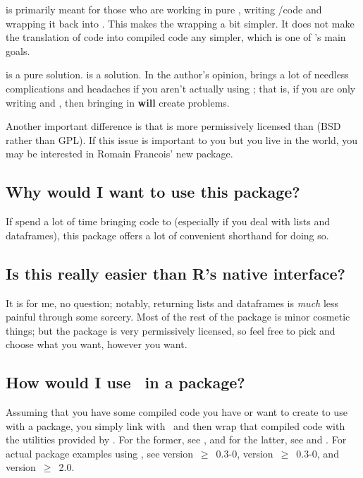 \thispackage is primarily meant for those who are working in pure \C, writing 
\C/\Fortran code and wrapping it back into \R.  This makes the wrapping a bit 
simpler.  It does not make the translation of \R code into compiled code any 
simpler, which is one of 's main goals.

\thispackage is a pure \C solution.   is a \Cpp solution.  In the author's 
opinion, \Cpp brings a lot of needless complications and headaches if you aren't
actually using \Cpp; that is, if you are only writing \C and \Fortran, then 
bringing in \Cpp \textbf{will} create problems.  

Another important difference is that \thispackage is more permissively 
licensed than  (BSD rather than GPL).  If this issue is important to 
you but you live in the \Cpp world, you may be interested in Romain Francois' 
new  package.



\subsection{Why would I want to use this package?}
If spend a lot of time bringing code to \R (especially if you deal with lists 
and dataframes), this package offers a lot of convenient shorthand for doing so.



\subsection{Is this really easier than R's native interface?}
It is for me, no question; notably, returning lists and dataframes is 
\emph{much} less painful through some
\href{https://en.wikipedia.org/wiki/Stdarg.h}{}
sorcery.  Most of 
the rest of the package is minor cosmetic things; but the package is very 
permissively licensed, so feel free to pick and choose what you want, however 
you want.


\subsection{How would I use \thispackage\ in a package?}
Assuming that you have some compiled code you have or want to create to use with 
a package, you simply link with \thispackage\ and then wrap that compiled code 
with the utilities provided by \thispackage.  For the former, see 
, and for the latter, see  and 
.  For actual package examples using \thispackage, see 
\href{http://cran.r-project.org/web/packages/pbdBASE/index.html}{} 
version~$\geq$~0.3-0,  
\href{http://cran.r-project.org/web/packages/pbdDMAT/index.html}{}
version~$\geq$~0.3-0, and
\href{http://cran.r-project.org/web/packages/memuse/index.html}{}
version~$\geq$~2.0.

